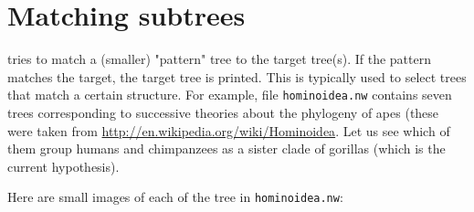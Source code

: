 \section{Matching subtrees}
\label{sct_match}

\match{} tries to match a (smaller) "pattern" tree to the target tree(s). If
the pattern matches the target, the target tree is printed. This is typically
used to select trees that match a certain structure. For example, file
\texttt{hominoidea.nw} contains seven trees corresponding to successive
theories about the phylogeny of apes (these were taken from
\url{http://en.wikipedia.org/wiki/Hominoidea}. Let us see which of them group
humans and chimpanzees as a sister clade of gorillas (which is the current
hypothesis).

Here are small images of each of the tree in \texttt{hominoidea.nw}: \\
\bigskip{} \\
